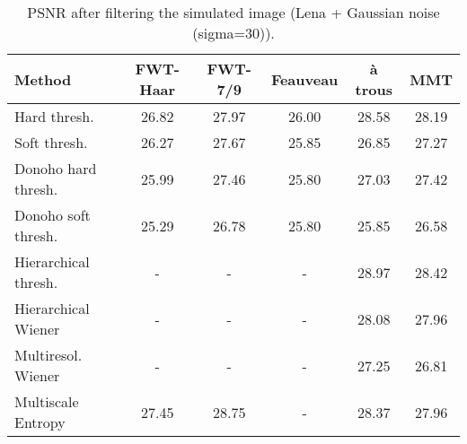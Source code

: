 \begin{table}[hbt]
\begin{center}
\begin{tabular}{lccccc} \hline \hline
Method               & FWT-Haar  & FWT-7/9    & Feauveau & \`a trous & MMT \\ \hline \hline
Hard thresh.         & 26.82 & 27.97 &  26.00   &  28.58   & 28.19  \\
Soft thresh.         & 26.27 & 27.67 &  25.85   &  26.85   & 27.27  \\
Donoho hard thresh.  & 25.99 & 27.46 &  25.80   &  27.03   & 27.42   \\
Donoho soft thresh.  & 25.29 & 26.78 &  25.80   &  25.85   & 26.58   \\
Hierarchical thresh. &     - &  -    &   -      &  28.97   & 28.42   \\
Hierarchical Wiener  &     - &  -    &   -      &  28.08   & 27.96 \\
Multiresol. Wiener   &     - &  -    &   -      &  27.25   & 26.81  \\
Multiscale Entropy   &  27.45 & 28.75  &   -      &  28.37    & 27.96 \\ \hline \hline
\end{tabular}
\caption{PSNR after filtering the simulated image (Lena + Gaussian noise 
(sigma=30)).}
\vspace{0.5cm}
\end{center}
\label{comptab1}
\end{table}


